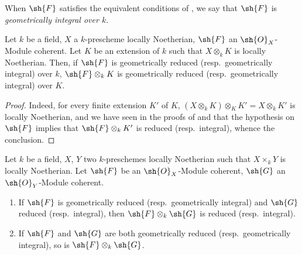 \begin{definition}[4.6.19]
\label{IV.4.6.19}
When $\sh{F}$ satisfies the equivalent conditions of , we say that $\sh{F}$ is \emph{geometrically integral over $k$}.
\end{definition}

\begin{proposition}[4.6.20]
\label{IV.4.6.20}
Let $k$ be a field, $X$ a $k$-prescheme locally Noetherian, $\sh{F}$ an $\sh{O}_X$-Module coherent.
Let $K$ be an extension of $k$ such that $X\otimes_k K$ is locally Noetherian.
Then, if $\sh{F}$ is geometrically reduced (resp.\ geometrically integral) over $k$, $\sh{F}\otimes_k K$ is geometrically reduced (resp.\ geometrically integral) over $K$.
\end{proposition}

\begin{proof}
Indeed, for every finite extension $K'$ of $K$, $(X\otimes_k K)\otimes_K K' = X\otimes_k K'$ is locally Noetherian, and we have seen in the proofs of  and  that the hypothesis on $\sh{F}$ implies that $\sh{F}\otimes_k K'$ is reduced (resp.\ integral), whence the conclusion.
\end{proof}

\begin{proposition}[4.6.21]
\label{IV.4.6.21}
Let $k$ be a field, $X$, $Y$ two $k$-preschemes locally Noetherian such that $X\times_k Y$ is locally Noetherian.
Let $\sh{F}$ be an $\sh{O}_X$-Module coherent, $\sh{G}$ an $\sh{O}_Y$-Module coherent.
\begin{enumerate}[label=(\roman*)]
  \item If $\sh{F}$ is geometrically reduced (resp.\ geometrically integral) and $\sh{G}$ reduced (resp.\ integral), then $\sh{F}\otimes_k\sh{G}$ is reduced (resp.\ integral).
  \item If $\sh{F}$ and $\sh{G}$ are both geometrically reduced (resp.\ geometrically integral), so is $\sh{F}\otimes_k\sh{G}$.
\end{enumerate}
\end{proposition}

